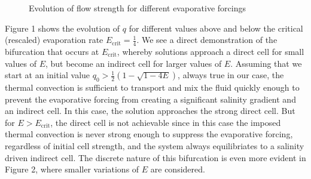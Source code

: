 \documentclass[letterpaper, 11pt]{article}
\begin{document}
\begin{figure}[p]
\begin{center}
\caption{Evolution of flow strength for different evaporative forcings}
\end{center}
\end{figure}

Figure 1 shows the evolution of $q$ for different values above and below the critical (rescaled) evaporation rate $E_\mathrm{crit} = \frac{1}{4}$. We see a direct demonstration of the bifurcation that occurs at $E_\mathrm{crit}$, whereby solutions approach a direct cell for small values of $E$, but become an indirect cell for larger values of $E$. Assuming that we start at an initial value $q_0 > \frac{1}{2} (1 - \sqrt{1 -4E})$, always true in our case, the thermal convection is sufficient to transport and mix the fluid quickly enough to prevent the evaporative forcing from creating a significant salinity gradient and an indirect cell. In this case, the solution approaches the strong direct cell. But for $E > E_\mathrm{crit}$, the direct cell is not achievable since in this case the imposed thermal convection is never strong enough to suppress the evaporative forcing, regardless of initial cell strength, and the system always equilibriates to a salinity driven indirect cell. The discrete nature of this bifurcation is even more evident in Figure 2, where smaller variations of $E$ are considered.
\end{document}
